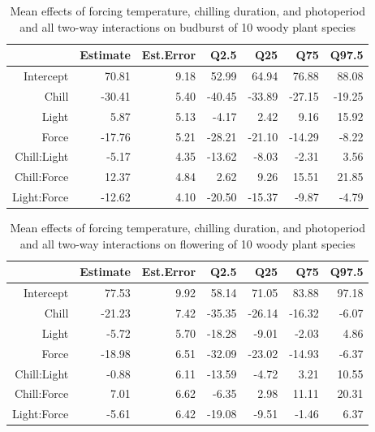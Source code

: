 \documentclass{article}\usepackage[]{graphicx}\usepackage[]{color}
\begin{document}
\begin{table}[ht]
\centering
\begin{tabular}{rrrrrrr}
  \hline
 & Estimate & Est.Error & Q2.5 & Q25 & Q75 & Q97.5 \\ 
  \hline
Intercept & 70.81 & 9.18 & 52.99 & 64.94 & 76.88 & 88.08 \\ 
  Chill & -30.41 & 5.40 & -40.45 & -33.89 & -27.15 & -19.25 \\ 
  Light & 5.87 & 5.13 & -4.17 & 2.42 & 9.16 & 15.92 \\ 
  Force & -17.76 & 5.21 & -28.21 & -21.10 & -14.29 & -8.22 \\ 
  Chill:Light & -5.17 & 4.35 & -13.62 & -8.03 & -2.31 & 3.56 \\ 
  Chill:Force & 12.37 & 4.84 & 2.62 & 9.26 & 15.51 & 21.85 \\ 
  Light:Force & -12.62 & 4.10 & -20.50 & -15.37 & -9.87 & -4.79 \\ 
   \hline
\end{tabular}
\caption{ Mean effects of forcing temperature, chilling duration, and photoperiod and all two-way interactions on budburst of 10 woody plant species} 
\label{tab:modelests}
\end{table}
\begin{table}[ht]
\centering
\begin{tabular}{rrrrrrr}
  \hline
 & Estimate & Est.Error & Q2.5 & Q25 & Q75 & Q97.5 \\ 
  \hline
Intercept & 77.53 & 9.92 & 58.14 & 71.05 & 83.88 & 97.18 \\ 
  Chill & -21.23 & 7.42 & -35.35 & -26.14 & -16.32 & -6.07 \\ 
  Light & -5.72 & 5.70 & -18.28 & -9.01 & -2.03 & 4.86 \\ 
  Force & -18.98 & 6.51 & -32.09 & -23.02 & -14.93 & -6.37 \\ 
  Chill:Light & -0.88 & 6.11 & -13.59 & -4.72 & 3.21 & 10.55 \\ 
  Chill:Force & 7.01 & 6.62 & -6.35 & 2.98 & 11.11 & 20.31 \\ 
  Light:Force & -5.61 & 6.42 & -19.08 & -9.51 & -1.46 & 6.37 \\ 
   \hline
\end{tabular}
\caption{ Mean effects of forcing temperature, chilling duration, and photoperiod and all two-way interactions on flowering of 10 woody plant species} 
\label{tab:modelests2}
\end{table}
\end{document}
